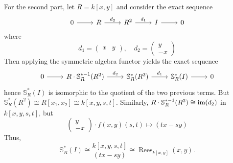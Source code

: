 \documentclass[../../master.tex]{subfiles}
\DeclareMathOperator{\Rees}{Rees}
\begin{document}
\begin{solution}
    For the second part, let $R = k[x, y]$ and consider the exact sequence
    \[
    \begin{tikzcd}
        0 & R & R^2 & I & 0
        \arrow[from=1-1, to=1-2] 
        \arrow[from=1-2, to=1-3, "d_2"] 
        \arrow[from=1-3, to=1-4, "d_1"] 
        \arrow[from=1-4, to=1-5] 
    \end{tikzcd}
    \]
    where
    \[
    d_1 = 
    \begin{pmatrix}
        x & y
    \end{pmatrix}, \quad
    d_2 =
    \begin{pmatrix}
        y \\
        -x
    \end{pmatrix}
    \]
    Then applying the symmetric algebra functor yields the exact sequence
    \[
    \begin{tikzcd}
        0 & R \cdot \mathbb{S}_R^{*-1}(R^2) & \mathbb{S}_R^{*}(R^2) & \mathbb{S}_R^{*}(I) & 0
        \arrow[from=1-1, to=1-2] 
        \arrow[from=1-2, to=1-3, "d_2"] 
        \arrow[from=1-3, to=1-4, "d_1"] 
        \arrow[from=1-4, to=1-5] 
    \end{tikzcd}
    \]
    hence $\mathbb{S}_R^{*}(I)$ is isomorphic to the quotient of the two previous terms.
    But $\mathbb{S}_R^{*}(R^2) \cong R[x_1, x_2] \cong k[x, y, s, t]$.
    Similarly, $R \cdot \mathbb{S}_R^{*-1}(R^2) \cong \operatorname{im}(d_2)$ in $k[x, y, s, t]$, but
    \[
        \begin{pmatrix}
            y \\
            -x
        \end{pmatrix} \cdot f(x, y)(s, t) \mapsto (tx - sy)
    \]
    Thus,
    \[
    \mathbb{S}_R^{*}(I) \cong \frac{k[x, y, s, t]}{(tx - sy)} \cong \Rees_{k[x, y]}(x, y).
    \]
\end{solution}
\end{document}
